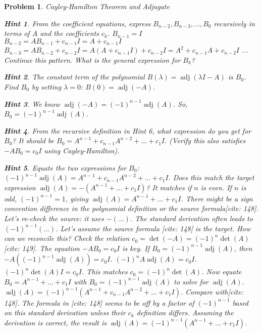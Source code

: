 \documentclass[12pt]{article}
\newtheorem{problem}{Problem}[section]
\theoremstyle{definition}
\newtheorem{hint}{Hint}[question]
\newcommand{\adj}{\operatorname{adj}}
\newcommand{\detm}{\operatorname{det}}
\begin{document}
\begin{problem}{Cayley-Hamilton Theorem and Adjugate}
\begin{hint}
        From the coefficient equations, express $B_{n-2}, B_{n-3}, \dots, B_0$ recursively in terms of $A$ and the coefficients $c_k$.
        $B_{n-1}=I$
        $B_{n-2} = A B_{n-1} + c_{n-1}I = A + c_{n-1}I$
        $B_{n-3} = A B_{n-2} + c_{n-2}I = A(A+c_{n-1}I) + c_{n-2}I = A^2 + c_{n-1}A + c_{n-2}I$
        ... Continue this pattern. What is the general expression for $B_k$?
    \end{hint}
    \begin{hint}
        The constant term of the polynomial $B(\lambda) = \adj(\lambda I - A)$ is $B_0$. Find $B_0$ by setting $\lambda = 0$: $B(0) = \adj(-A)$.
    \end{hint}
    \begin{hint}
        We know $\adj(-A) = (-1)^{n-1} \adj(A)$. So, $B_0 = (-1)^{n-1} \adj(A)$.
    \end{hint}
    \begin{hint}
        From the recursive definition in Hint 6, what expression do you get for $B_0$? It should be $B_0 = A^{n-1} + c_{n-1}A^{n-2} + \dots + c_1 I$. (Verify this also satisfies $-AB_0=c_0 I$ using Cayley-Hamilton).
    \end{hint}
    \begin{hint}
        Equate the two expressions for $B_0$: $(-1)^{n-1} \adj(A) = A^{n-1} + c_{n-1}A^{n-2} + \dots + c_1 I$.
        Does this match the target expression $\adj(A) = - (A^{n-1} + \dots + c_1 I)$? It matches if $n$ is even. If $n$ is odd, $(-1)^{n-1}=1$, giving $\adj(A) = A^{n-1} + \dots + c_1 I$. There might be a sign convention difference in the polynomial definition or the source formula[cite: 148]. Let's re-check the source: it uses $-(...)$. The standard derivation often leads to $(-1)^{n-1}(...)$. Let's assume the source formula [cite: 148] is the target. How can we reconcile this? Check the relation $c_0 = \detm(-A) = (-1)^n \detm(A)$[cite: 149]. The equation $-AB_0=c_0I$ is key. If $B_0 = (-1)^{n-1}\adj(A)$, then $-A((-1)^{n-1}\adj(A)) = c_0 I$. $(-1)^n A \adj(A) = c_0 I$. $(-1)^n \detm(A) I = c_0 I$. This matches $c_0 = (-1)^n \detm(A)$. Now equate $B_0 = A^{n-1} + \dots + c_1 I$ with $B_0 = (-1)^{n-1} \adj(A)$ to solve for $\adj(A)$.
        $\adj(A) = (-1)^{n-1} (A^{n-1} + c_{n-1}A^{n-2} + \dots + c_1 I)$. Compare with[cite: 148]. The formula in [cite: 148] seems to be off by a factor of $(-1)^{n-1}$ based on this standard derivation unless their $c_k$ definition differs. Assuming the derivation is correct, the result is $\adj(A) = (-1)^{n-1} (A^{n-1} + \dots + c_1 I)$.
    \end{hint}


\end{problem}
\end{document}
